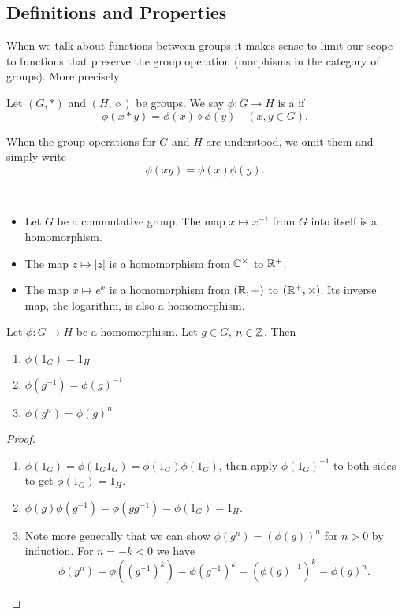 \subsection{Definitions and Properties}
When we talk about functions between groups it makes sense to limit our scope to functions that preserve the group operation (morphisms in the category of groups). More precisely:

\begin{definition}[Homomorphism]
Let $(G,\ast)$ and $(H,\diamond)$ be groups. We say $\phi\colon G\to H$ is a  if
\[\phi(x\ast y)=\phi(x)\diamond\phi(y)\quad(x,y\in G).\]
\end{definition}

When the group operations for $G$ and $H$ are understood, we omit them and simply write
\[\phi(xy)=\phi(x)\phi(y).\]

\begin{example} \
\begin{itemize}
\item Let $G$ be a commutative group. The map $x\mapsto x^{-1}$ from $G$ into itself is a homomorphism.
\item The map $z\mapsto|z|$ is a homomorphism from $\mathbb C^\times$ to $\mathbb R^+$.
\item The map $x\mapsto e^x$ is a homomorphism from $(\mathbb R,+)$ to $(\mathbb R^+,\times)$. Its inverse map, the logarithm, is also a homomorphism.
\end{itemize}
\end{example}

\begin{lemma}
Let $\phi\colon G\to H$ be a homomorphism. Let $g\in G$, $n\in\mathbb Z$. Then
\begin{enumerate}[label=(\roman*)]
\item $\phi(1_G)=1_H$
\item $\phi(g^{-1})=\phi(g)^{-1}$
\item $\phi(g^n)=\phi(g)^n$
\end{enumerate}
\end{lemma}

\begin{proof} \
\begin{enumerate}[label=(\roman*)]
\item $\phi(1_G)=\phi(1_G 1_G)=\phi(1_G)\phi(1_G)$, then apply $\phi(1_G)^{-1}$ to both sides to get $\phi(1_G)=1_H$.

\item $\phi(g)\phi(g^{-1})=\phi(gg^{-1})=\phi(1_G)=1_H$.

\item Note more generally that we can show $\phi(g^n)=(\phi(g))^n$ for $n>0$ by induction. For $n=-k<0$ we have
\[\phi(g^n)=\phi((g^{-1})^k)=\phi(g^{-1})^k=(\phi(g)^{-1})^k=\phi(g)^n.\]
\end{enumerate}
\end{proof}

